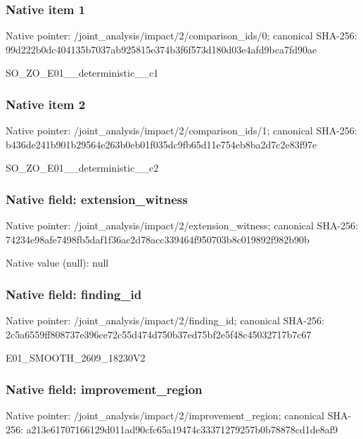 \documentclass[10pt,a4paper]{article}
\begin{document}
\subsubsection{Native item 1}
Native pointer: /joint\_\allowbreak{}analysis/impact/2/comparison\_\allowbreak{}ids/0; canonical SHA-256: 99d222b0dc404135b7037ab925815e374b3f6f573d180d03e4afd9bca7fd90ae

\begingroup\raggedright\sloppy SO\_\allowbreak{}ZO\_\allowbreak{}E01\_\allowbreak{}\_\allowbreak{}deterministic\_\allowbreak{}\_\allowbreak{}c1\par\endgroup

\subsubsection{Native item 2}
Native pointer: /joint\_\allowbreak{}analysis/impact/2/comparison\_\allowbreak{}ids/1; canonical SHA-256: b436de241b901b29564e263b0eb01f035dc9fb65d11e754eb8ba2d7c2e83f97e

\begingroup\raggedright\sloppy SO\_\allowbreak{}ZO\_\allowbreak{}E01\_\allowbreak{}\_\allowbreak{}deterministic\_\allowbreak{}\_\allowbreak{}c2\par\endgroup

\subsubsection{Native field: extension\_\allowbreak{}witness}
Native pointer: /joint\_\allowbreak{}analysis/impact/2/extension\_\allowbreak{}witness; canonical SHA-256: 74234e98afe7498fb5daf1f36ac2d78acc339464f950703b8c019892f982b90b

Native value (null): null

\subsubsection{Native field: finding\_\allowbreak{}id}
Native pointer: /joint\_\allowbreak{}analysis/impact/2/finding\_\allowbreak{}id; canonical SHA-256: 2c5a6559ff808737e396ce72c55d474d750b37ed75bf2e5f48c45032717b7c67

\begingroup\raggedright\sloppy E01\_\allowbreak{}SMOOTH\_\allowbreak{}2609\_\allowbreak{}18230V2\par\endgroup

\subsubsection{Native field: improvement\_\allowbreak{}region}
Native pointer: /joint\_\allowbreak{}analysis/impact/2/improvement\_\allowbreak{}region; canonical SHA-256: a213e61707166129d011ad90cfc65a19474c33371279257b0b78878cd1de8af9
\end{document}
